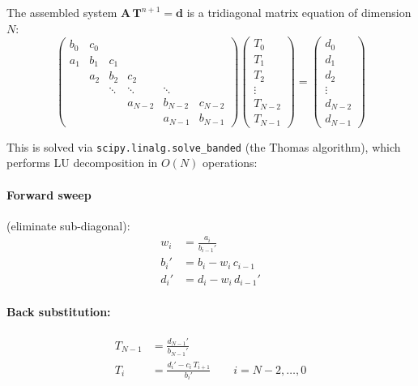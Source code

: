 \documentclass[11pt,a4paper]{article}
\begin{document}
The assembled system $\mathbf{A}\,\mathbf{T}^{n+1} = \mathbf{d}$ is a
tridiagonal matrix equation of dimension $N$:
\begin{equation}
\begin{pmatrix}
b_0 & c_0 \\
a_1 & b_1 & c_1 \\
    & a_2 & b_2 & c_2 \\
    &     & \ddots & \ddots & \ddots \\
    &     &        & a_{N-2} & b_{N-2} & c_{N-2} \\
    &     &        &         & a_{N-1} & b_{N-1}
\end{pmatrix}
\begin{pmatrix} T_0 \\ T_1 \\ T_2 \\ \vdots \\ T_{N-2} \\ T_{N-1} \end{pmatrix}
=
\begin{pmatrix} d_0 \\ d_1 \\ d_2 \\ \vdots \\ d_{N-2} \\ d_{N-1} \end{pmatrix}
\end{equation}

This is solved via \texttt{scipy.linalg.solve\_banded} (the Thomas
algorithm), which performs LU decomposition in $O(N)$ operations:

\paragraph{Forward sweep} (eliminate sub-diagonal):
\begin{align}
w_i &= \frac{a_i}{b_{i-1}'} \\
b_i' &= b_i - w_i\,c_{i-1} \\
d_i' &= d_i - w_i\,d_{i-1}'
\end{align}

\paragraph{Back substitution:}
\begin{align}
T_{N-1} &= \frac{d_{N-1}'}{b_{N-1}'} \\
T_i     &= \frac{d_i' - c_i\,T_{i+1}}{b_i'} \qquad i = N{-}2, \ldots, 0
\end{align}
\end{document}
